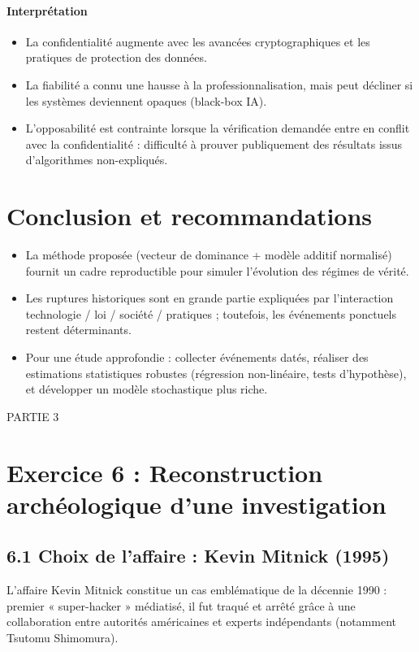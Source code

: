 \documentclass[12pt,a4paper]{article}
\begin{document}
\paragraph{Interprétation}
\begin{itemize}
  \item La confidentialité augmente avec les avancées cryptographiques et les pratiques de protection des données.
  \item La fiabilité a connu une hausse à la professionnalisation, mais peut décliner si les systèmes deviennent opaques (black-box IA).
  \item L'opposabilité est contrainte lorsque la vérification demandée entre en conflit avec la confidentialité : difficulté à prouver publiquement des résultats issus d'algorithmes non-expliqués.
\end{itemize}

\section{Conclusion et recommandations}
\begin{itemize}
  \item La méthode proposée (vecteur de dominance + modèle additif normalisé) fournit un cadre reproductible pour simuler l'évolution des régimes de vérité.
  \item Les ruptures historiques sont en grande partie expliquées par l'interaction technologie / loi / société / pratiques ; toutefois, les événements ponctuels restent déterminants.
  \item Pour une étude approfondie : collecter événements datés, réaliser des estimations statistiques robustes (régression non-linéaire, tests d'hypothèse), et développer un modèle stochastique plus riche.
\end{itemize}
\begin{LARGE}
PARTIE 3
\end{LARGE}
\section{Exercice 6 : Reconstruction archéologique d’une investigation}
\subsection{6.1 Choix de l’affaire : Kevin Mitnick (1995)}
L’affaire Kevin Mitnick constitue un cas emblématique de la décennie 1990 : premier « super-hacker » médiatisé, il fut traqué et arrêté grâce à une collaboration entre autorités américaines et experts indépendants (notamment Tsutomu Shimomura).
\end{document}
